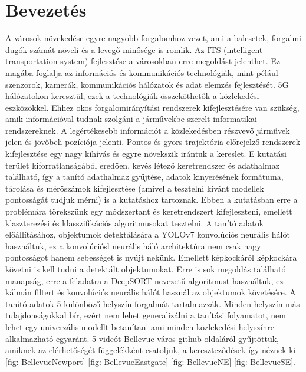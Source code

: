 \documentclass[acmtog, authorversion]{acmart}
\begin{document}
\section{Bevezetés}
A városok növekedése egyre nagyobb forgalomhoz vezet, ami a balesetek, forgalmi dugók számát növeli és a levegő minősége is romlik.
Az ITS (intelligent transportation system) fejlesztése a városokban erre megoldást jelenthet. Ez magába foglalja az információs és
kommunikációs technológiák, mint pélául szenzorok, kamerák, kommunikációs hálózatok és adat elemzés fejlesztését. 5G hálózatokon
keresztül, ezek a technológiák összeköthetők a közlekedési eszközökkel. Ehhez okos forgalomirányítási rendszerek kifejlesztésére
van szükség, amik információval tudnak szolgáni a járművekbe szerelt informatikai rendszereknek.
A legértékesebb információt a közlekedésben részvevő járművek jelen és jövőbeli pozíciója jelenti. Pontos és gyors trajektória 
előrejelző rendszerek kifejlesztése egy nagy kihívás és egyre növekszik irántuk a kereslet. E kutatási terület kiforratlanságából
eredően, kevés létező keretrendszer és adathalmaz található, így a tanító adathalmaz gyűjtése, adatok kinyerésének formátuma, tárolása
és mérőszámok kifejlesztése (amivel a tesztelni kívánt modellek pontosságát tudjuk mérni) is a kutatáshoz tartoznak.  
Ebben a kutatásban erre a problémára törekszünk egy módszertant és keretrendszert kifejleszteni, emellett klaszterezési és klasszifikációs
algoritmusokat tesztelni. A tanító adatok előállításához, objektumok detektálására a YOLOv7 \cite{wang2022yolov7}
konvolúciós neurális hálót használtuk, ez a konvolúciósl neurális háló architektúra nem csak nagy pontosságot hanem sebességet is nyújt nekünk. 
Emellett képkockáról képkockára követni is kell tudni a detektált objektumokat. Erre is sok megoldás található manapság, erre a feladatra
a DeepSORT \cite{Wojke2018deep} nevezetű algoritmust használtuk, ez kálmán filtert és konvolúciós neurális hálót használ az objektumok követésére.
A tanító adatok 5 különböző helyszín forgalmát tartalmazzák. Minden helyszín más tulajdonságokkal bír, ezért nem lehet generalizálni
a tanítási folyamatot, nem lehet egy univerzális modellt betanítani ami minden közlekedési helyszínre alkalmazható egyaránt.
5 videót Bellevue város github oldaláról gyűjtöttük, amiknek az elérhetőségét függelékként csatoljuk, a kereszteződések így néznek ki
\ref{fig: BellevueNewport} \ref{fig: BellevueEastgate} \ref{fig: BellevueNE} \ref{fig: BellevueSE}.
\end{document}
